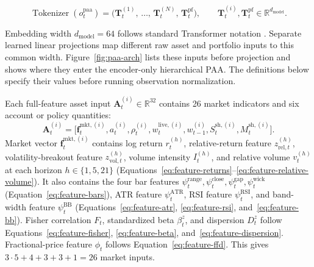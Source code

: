\begin{equation}
\operatorname{Tokenizer}(o_t^{\text{paa}}) = \big(\mathbf{T}^{(1)}_t,\, \dots,\, \mathbf{T}^{(N)}_t,\, \mathbf{T}^{\text{pf}}_t\big), \qquad \mathbf{T}^{(i)}_t, \mathbf{T}^{\text{pf}}_t \in \mathbb{R}^{d_{\text{model}}}.
\label{eq:paa-token-sequence}
\end{equation}

Embedding width \(d_{\mathrm{model}}=64\) follows standard Transformer notation \cite{vaswani2017}. Separate learned linear projections map different raw asset and portfolio inputs to this common width. Figure~\ref{fig:paa-arch} lists these inputs before projection and shows where they enter the encoder-only hierarchical PAA. The definitions below specify their values before running observation normalization.

Each full-feature asset input \(\mathbf A_t^{(i)}\in\mathbb R^{32}\) contains 26 market indicators and six account or policy quantities:
\begin{equation}
\mathbf A_t^{(i)}=
\big[\mathbf f_t^{\mathrm{mkt},(i)},a_t^{(i)},\rho_t^{(i)},
w_t^{\mathrm{live},(i)},w_{t-1}^{(i)},S_t^{\mathrm{sh},(i)},M_t^{\mathrm{sh},(i)}\big].
\label{eq:paa-asset-inputs}
\end{equation}
Market vector \(\mathbf f_t^{\mathrm{mkt},(i)}\) contains log return \(r_t^{(h)}\), relative-return feature \(z_{\mathrm{rel},t}^{(h)}\), volatility-breakout feature \(z_{\mathrm{vol},t}^{(h)}\), volume intensity \(I_t^{(h)}\), and relative volume \(v_t^{(h)}\) at each horizon \(h\in\{1,5,21\}\) (Equations~\eqref{eq:feature-returns}--\eqref{eq:feature-relative-volume}). It also contains the four bar features \(\psi_t^{\mathrm{range}},\psi_t^{\mathrm{close}},\psi_t^{\mathrm{gap}},\psi_t^{\mathrm{wick}}\) (Equation~\eqref{eq:feature-bars}), ATR feature \(\psi_t^{\mathrm{ATR}}\), RSI feature \(\psi_t^{\mathrm{RSI}}\), and band-width feature \(\psi_t^{\mathrm{BB}}\) (Equations~\eqref{eq:feature-atr}, \eqref{eq:feature-rsi}, and~\eqref{eq:feature-bb}). Fisher correlation \(F_t\), standardized beta \(\beta_t^z\), and dispersion \(D_t^z\) follow Equations~\eqref{eq:feature-fisher}, \eqref{eq:feature-beta}, and~\eqref{eq:feature-dispersion}. Fractional-price feature \(\phi_t\) follows Equation~\eqref{eq:feature-ffd}. This gives \(3\cdot5+4+3+3+1=26\) market inputs.

